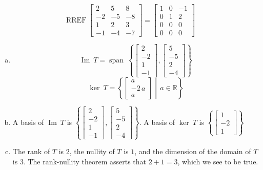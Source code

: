 \begin{exerciseAnswer} 


\[\operatorname{RREF} \left[\begin{array}{ccc}
2 & 5 & 8 \\
-2 & -5 & -8 \\
1 & 2 & 3 \\
-1 & -4 & -7
\end{array}\right] = \left[\begin{array}{ccc}
1 & 0 & -1 \\
0 & 1 & 2 \\
0 & 0 & 0 \\
0 & 0 & 0
\end{array}\right] \]


\begin{enumerate}[(a)]
\item \[\operatorname{Im}\ T = \operatorname{span}\  \left\{ \left[\begin{array}{c}
2 \\
-2 \\
1 \\
-1
\end{array}\right] , \left[\begin{array}{c}
5 \\
-5 \\
2 \\
-4
\end{array}\right] \right\} \]\[\operatorname{ker}\ T =  \left\{ \left[\begin{array}{c}
a \\
-2 \, a \\
a
\end{array}\right] \middle|\,a\in\mathbb{R}\right\} \]
\item  A basis of \(\operatorname{Im}\ T\) is \( \left\{ \left[\begin{array}{c}
2 \\
-2 \\
1 \\
-1
\end{array}\right] , \left[\begin{array}{c}
5 \\
-5 \\
2 \\
-4
\end{array}\right] \right\} \). A basis of \(\operatorname{ker}\ T\) is \( \left\{ \left[\begin{array}{c}
1 \\
-2 \\
1
\end{array}\right] \right\} \)
\item  The rank of \(T\) is \( 2 \), the nullity of \(T\) is \( 1 \), and the dimension of the domain of \(T\) is \( 3 \). The rank-nullity theorem asserts that \( 2 + 1 = 3 \), which we see to be true. 
\end{enumerate}
    
\end{exerciseAnswer}
    
